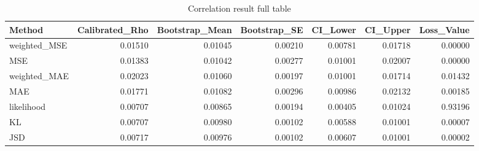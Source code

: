 \begin{table}[H]
\caption{ Correlation result full table}
\label{tab:correlation result}
\begin{tabular}{lrrrrrr}
\toprule
Method & Calibrated_Rho & Bootstrap_Mean & Bootstrap_SE & CI_Lower & CI_Upper & Loss_Value \\
\midrule
weighted_MSE & 0.01510 & 0.01045 & 0.00210 & 0.00781 & 0.01718 & 0.00000 \\
MSE & 0.01383 & 0.01042 & 0.00277 & 0.01001 & 0.02007 & 0.00000 \\
weighted_MAE & 0.02023 & 0.01060 & 0.00197 & 0.01001 & 0.01714 & 0.01432 \\
MAE & 0.01771 & 0.01082 & 0.00296 & 0.00986 & 0.02132 & 0.00185 \\
likelihood & 0.00707 & 0.00865 & 0.00194 & 0.00405 & 0.01024 & 0.93196 \\
KL & 0.00707 & 0.00980 & 0.00102 & 0.00588 & 0.01001 & 0.00007 \\
JSD & 0.00717 & 0.00976 & 0.00102 & 0.00607 & 0.01001 & 0.00002 \\
\bottomrule
\end{tabular}
\end{table}
